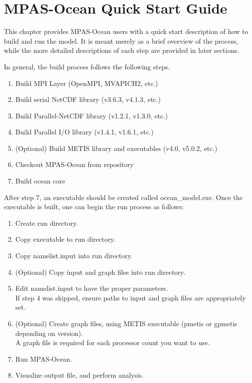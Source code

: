 \chapter{MPAS-Ocean Quick Start Guide}
\label{chap:quick_start}

This chapter provides MPAS-Ocean users with a quick start description of how to
build and run the model. It is meant merely as a brief overview of the process,
while the more detailed descriptions of each step are provided in later
sections.

In general, the build process follows the following steps.

\begin{enumerate}
	\item Build MPI Layer (OpenMPI, MVAPICH2, etc.)
	\item Build serial NetCDF library (v3.6.3, v4.1.3, etc.)
	\item Build Parallel-NetCDF library (v1.2.1, v1.3.0, etc.)
	\item Build Parallel I/O library (v1.4.1, v1.6.1, etc.)
	\item (Optional) Build METIS library and executables (v4.0, v5.0.2, etc.)
	\item Checkout MPAS-Ocean from repository
	\item Build ocean core
\end{enumerate}

After step 7, an executable should be created called ocean\_model.exe. Once the executable is built, one can begin the run process as follows:

\begin{enumerate}
	\item Create run directory.
	\item Copy executable to run directory.
	\item Copy namelist.input into run directory.
	\item (Optional) Copy input and graph files into run directory.
	\item Edit namelist.input to have the proper parameters. \\
		  If step 4 was skipped, ensure paths to input and graph files are appropriately set.
	\item (Optional) Create graph files, using METIS executable (pmetis or gpmetis depending on version). \\
		  A graph file is required for each processor count you want to use.
	\item Run MPAS-Ocean.
	\item Visualize output file, and perform analysis.
\end{enumerate}
